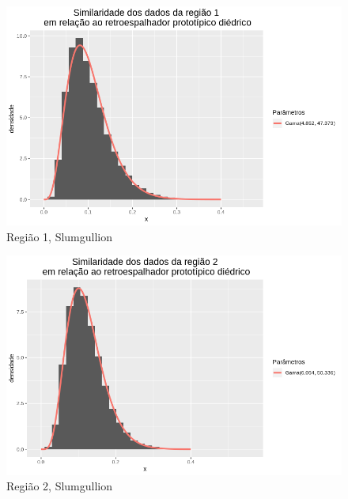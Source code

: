 \documentclass[12pt]{article}
\begin{document}
\begin{figure}[!h]
    \centering
    \vspace{0.1\linewidth}
    \includegraphics[width = \linewidth]{../../Images/Report_18_12_20/slum_di_region1.png}
    \caption{Região 1, Slumgullion}
    \label{fig:slum_di_r1}
\end{figure}

\begin{figure}[!h]
    \centering
    \vspace{0.1\linewidth}
    \includegraphics[width = \linewidth]{../../Images/Report_18_12_20/slum_di_region2.png}
    \caption{Região 2, Slumgullion}
    \label{fig:slum_di_r2}
\end{figure}
\end{document}
